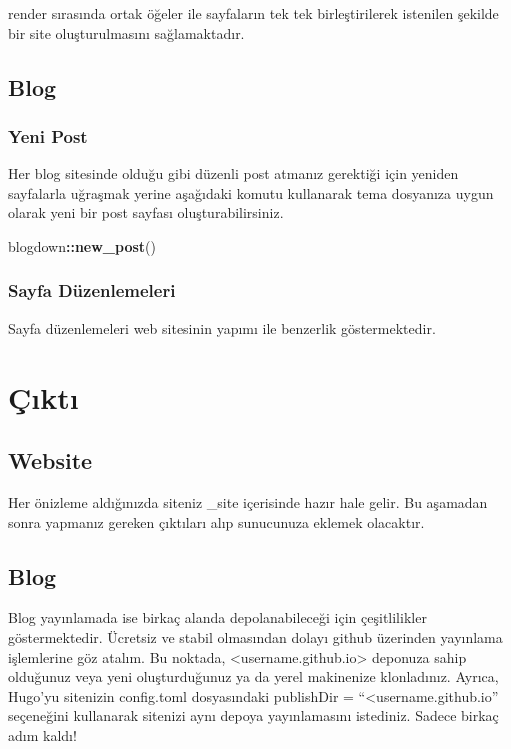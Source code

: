 \documentclass[]{book}
\newenvironment{Shaded}{\begin{snugshade}}{\end{snugshade}}
\newcommand{\KeywordTok}[1]{\textcolor[rgb]{0.13,0.29,0.53}{\textbf{#1}}}
\newcommand{\OperatorTok}[1]{\textcolor[rgb]{0.81,0.36,0.00}{\textbf{#1}}}
\newcommand{\NormalTok}[1]{#1}
\begin{document}
render sırasında ortak öğeler ile sayfaların tek tek birleştirilerek
istenilen şekilde bir site oluşturulmasını sağlamaktadır.

\subsection{Blog}\label{blog-1}

\subsubsection{Yeni Post}\label{yeni-post}

Her blog sitesinde olduğu gibi düzenli post atmanız gerektiği için
yeniden sayfalarla uğraşmak yerine aşağıdaki komutu kullanarak tema
dosyanıza uygun olarak yeni bir post sayfası oluşturabilirsiniz.

\begin{Shaded}
\begin{Highlighting}[]
\NormalTok{blogdown}\OperatorTok{::}\KeywordTok{new_post}\NormalTok{()}
\end{Highlighting}
\end{Shaded}

\subsubsection{Sayfa Düzenlemeleri}\label{sayfa-duzenlemeleri}

Sayfa düzenlemeleri web sitesinin yapımı ile benzerlik göstermektedir.

\section{Çıktı}\label{ckt}

\subsection{Website}\label{website-2}

Her önizleme aldığınızda siteniz \_site içerisinde hazır hale gelir. Bu
aşamadan sonra yapmanız gereken çıktıları alıp sunucunuza eklemek
olacaktır.

\subsection{Blog}\label{blog-2}

Blog yayınlamada ise birkaç alanda depolanabileceği için çeşitlilikler
göstermektedir. Ücretsiz ve stabil olmasından dolayı github üzerinden
yayınlama işlemlerine göz atalım. Bu noktada,
\textless{}username.github.io\textgreater{} deponuza sahip olduğunuz
veya yeni oluşturduğunuz ya da yerel makinenize klonladınız. Ayrıca,
Hugo'yu sitenizin config.toml dosyasındaki publishDir =
``\textless{}username.github.io'' seçeneğini kullanarak sitenizi aynı
depoya yayınlamasını istediniz. Sadece birkaç adım kaldı!
\end{document}
